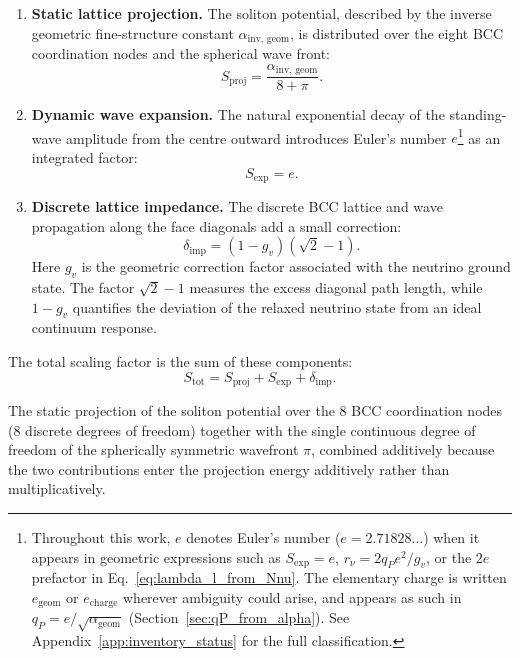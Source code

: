 \documentclass[10pt,a4paper]{article}
\begin{document}
\begin{enumerate}
	\item \textbf{Static lattice projection.}
	The soliton potential, described by the inverse geometric fine-structure constant \(\alpha_{\text{inv, geom}}\), is distributed over the eight BCC coordination nodes and the spherical wave front:
	\begin{equation}
		S_{\text{proj}} = \frac{\alpha_{\text{inv, geom}}}{8 + \pi}.
	\end{equation}
	
	\item \textbf{Dynamic wave expansion.}
	The natural exponential decay of the standing-wave amplitude from the centre outward introduces Euler's number \(e\)\footnote{Throughout this work, $e$ denotes Euler's number ($e = 2.71828\ldots$) when it appears in geometric expressions such as $S_{\text{exp}} = e$, $r_\nu = 2 q_P e^2/g_v$, or the $2e$ prefactor in Eq.~\eqref{eq:lambda_l_from_Nnu}. The elementary charge is written $e_{\text{geom}}$ or $e_{\text{charge}}$ wherever ambiguity could arise, and appears as such in $q_P = e/\sqrt{\alpha_{\text{geom}}}$ (Section~\ref{sec:qP_from_alpha}). See Appendix~\ref{app:inventory_status} for the full classification.} as an integrated factor:
	\begin{equation}
		S_{\text{exp}} = e.
	\end{equation}
	
	\item \textbf{Discrete lattice impedance.}
	The discrete BCC lattice and wave propagation along the face diagonals add a small correction:
	\begin{equation}
		\delta_{\text{imp}} = (1 - g_v)(\sqrt{2} - 1).
	\end{equation}
	Here \(g_v\) is the geometric correction factor associated with the neutrino ground state. The factor \(\sqrt{2}-1\) measures the excess diagonal path length, while \(1-g_v\) quantifies the deviation of the relaxed neutrino state from an ideal continuum response.
\end{enumerate}

The total scaling factor is the sum of these components:
\begin{equation}
	S_{\text{tot}} = S_{\text{proj}} + S_{\text{exp}} + \delta_{\text{imp}}.
	\label{eq:S_tot}
\end{equation}

The static projection of the soliton potential over the 8 BCC coordination nodes (8 discrete degrees of freedom) together with the single continuous degree of freedom of the spherically symmetric wavefront $\pi$, combined additively because the two contributions enter the projection energy additively rather than multiplicatively.
\end{document}
